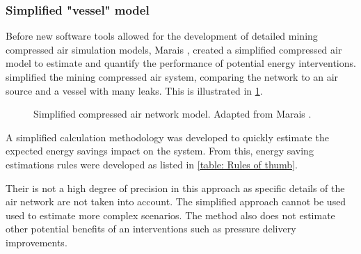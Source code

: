 \subsubsection{Simplified "vessel"  model}
Before new software tools allowed for the development of detailed mining compressed air simulation models, Marais \cite{Marais2012PhD},\cite{marais2013simplification} created a simplified compressed air model to estimate and quantify the performance of potential energy interventions.  \cite{Marais2012PhD} simplified the mining compressed air system, comparing the network to an air source and a vessel with many leaks. This is illustrated in \cref{fig:Marais vessel model}.
\begin{figure}[h!]
	\centering
	\caption[Simplified compressed air netowrk model.]{Simplified compressed air network model. Adapted from Marais \cite{Marais2012PhD}.}
	\label{fig:Marais vessel model}
\end{figure}
\par 
A simplified calculation methodology was developed to quickly estimate the expected energy savings impact on the system. From this, energy saving estimations rules were developed as listed in \cref{table: Rules of thumb}.  
\par 
Their is not a high degree of precision in this approach as specific details of the air network are not taken into account. The simplified approach cannot be used used to estimate more complex scenarios. The method also does not estimate other potential benefits of an interventions such as pressure delivery improvements.
\par 

